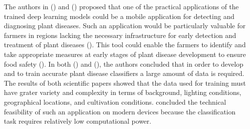 \documentclass{BachelorBUI}
\begin{document}
The authors in (\cite{Mohanty:2016}) and (\cite{Ferentinos:2018}) proposed that one of the practical applications of the trained deep learning models could be a mobile application for detecting and diagnosing plant diseases. Such an application would be particularly valuable for farmers in regions lacking the necessary infrastructure for early detection and treatment of plant diseases (\cite{Ferentinos:2018}). This tool could enable the farmers to identify and take appropriate measures at early stages of plant disease development to ensure food safety (\cite{Mohanty:2016}). In both (\cite{Mohanty:2016}) and (\cite{Ferentinos:2018}), the authors concluded that in order to develop and to train accurate plant disease classifiers a large amount of data is required. The results of both scientific papers showed that the data used for training must have grater variety and complexity in terms of background, lighting conditions, geographical locations, and cultivation conditions. \textcite{Ferentinos:2018} concluded the technical feasibility of such an application on modern devices because the classification task requires relatively low computational power.
\end{document}
